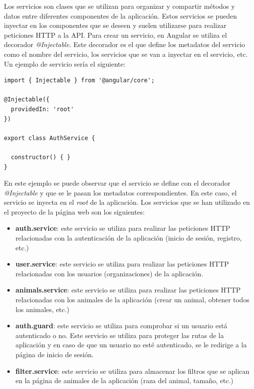 Los servicios son clases que se utilizan para organizar y compartir métodos y datos entre diferentes componentes de la aplicación. Estos servicios
se pueden inyectar en los componentes que se deseen y suelen utilizarse para realizar peticiones HTTP a la API.
Para crear un servicio, en Angular se utiliza el decorador \textit{@Injectable}. Este decorador
es el que define los metadatos del servicio como el nombre del servicio, los servicios que se van a inyectar en el servicio, etc. Un ejemplo de servicio
sería el siguiente:

\begin{lstlisting}
import { Injectable } from '@angular/core';

@Injectable({
  providedIn: 'root'
})

export class AuthService {

  constructor() { }
}
\end{lstlisting}

En este ejemplo se puede observar que el servicio se define con el decorador \textit{@Injectable} y que se le pasan los metadatos
correspondientes. En este caso, el servicio se inyecta en el \textit{root} de la aplicación. Los servicios que se han utilizado en el proyecto
de la página web son los siguientes:

\begin{itemize}
    \item \textbf{auth.service}: este servicio se utiliza para realizar las peticiones HTTP relacionadas con la autenticación de la aplicación (inicio de sesión, registro, etc.)
    \item \textbf{user.service}: este servicio se utiliza para realizar las peticiones HTTP relacionadas con los usuarios (organizaciones) de la aplicación.
    \item \textbf{animals.service}: este servicio se utiliza para realizar las peticiones HTTP relacionadas con los animales de la aplicación (crear un animal, obtener todos los animales, etc.)
    \item \textbf{auth.guard}: este servicio se utiliza para comprobar si un usuario está autenticado o no. Este servicio se utiliza para proteger las rutas de la aplicación y
    en caso de que un usuario no esté autenticado, se le redirige a la página de inicio de sesión.
    \item \textbf{filter.service}: este servicio se utiliza para almacenar los filtros que se aplican en la página de animales de la aplicación (raza del animal, tamaño, etc.)
\end{itemize}

